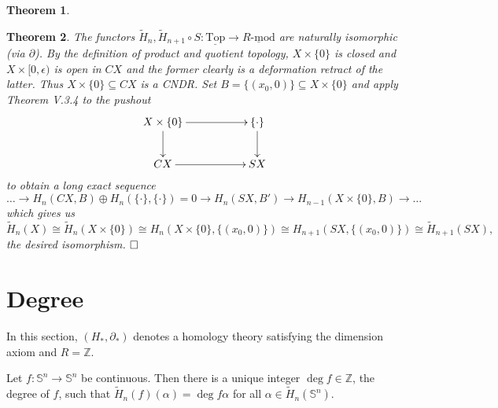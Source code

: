 \documentclass[11pt]{book}
\numberwithin{dummy}{section}
\newtheorem{theorem}{Theorem}[section]
\theoremstyle{nonumberbreak}
\newenvironment{defin}[1][]{\ifthenelse{\equal{#1}{}}{\definition}{\definition[#1]}\rm}{\enddefinition}
\newenvironment{pr}[1][]{\ifthenelse{\equal{#1}{}}{\proof}{\proof[#1]}\rm}{\endproof}
\newcommand{\Rmod}{\underline{R\textrm{-}\mathrm{mod}}}
\newcommand{\topsp}{\underline{\mathrm{Top}}}
\newcommand{\Sph}{\mathbb{S}}
\newcommand{\la}{\longrightarrow}
\newcommand{\Z}{\mathbb{Z}}
\begin{document}
\begin{spacing}{1.4}
\begin{theorem}
\begin{pr}
\end{pr}
\end{theorem}

\begin{theorem}
The functors $\tilde{H}_n, \tilde{H}_{n+1} \circ S: \topsp \la \Rmod$ are naturally isomorphic (via $\partial$).
\begin{pr}
By the definition of product and quotient topology, $X \times \{0\}$ is closed and $X \times [0,\epsilon)$ is open in $CX$ and the former clearly is a deformation retract of the latter. Thus $X \times \{0\} \subseteq CX$ is a CNDR. Set $B=\{(x_0,0)\} \subseteq X \times \{0\}$ and apply Theorem V.3.4 to the pushout
$$
\begin{xy}
\xymatrix{
X \times \{0\} \ar[rr] \ar[d] && \{\cdot\} \ar[d] \\ CX \ar[rr] && SX
}
\end{xy}
$$
to obtain a long exact sequence
$$\ldots \la   H_n(CX, B) \oplus H_n(\{\cdot\}, \{\cdot\}) = 0 \la H_n(SX, B') \la H_{n-1}(X \times \{0\}, B) \la \ldots$$
which gives us
$$\tilde{H}_n(X) \cong \tilde{H}_n(X \times \{0\}) \cong H_n(X \times \{0\}, \{(x_0,0)\}) \cong H_{n+1}(SX, \{(x_0,0)\}) \cong \tilde{H}_{n+1}(SX),$$
 the desired isomorphism. $\hfill \Box$

\end{pr}
\end{theorem}













\section{Degree} %






In this section, $(H_*, \partial_*)$ denotes a homology theory satisfying the dimension axiom and $R= \Z$.

\begin{defin}

Let $f: \Sph^n \la \Sph^n$ be continuous. Then there is a unique integer $\deg f \in \Z$, the degree of $f$, such that 
$\tilde{H}_n(f)(\alpha) = \deg f \alpha$
for all $\alpha \in \tilde{H}_n(\Sph^n)$.

\end{defin}



\end{spacing}
\end{document}
